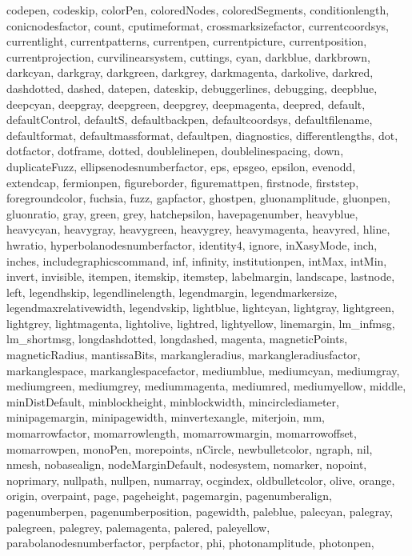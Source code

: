 {{  codepen, codeskip, colorPen, coloredNodes, coloredSegments,
  conditionlength, conicnodesfactor, count, cputimeformat,
  crossmarksizefactor, currentcoordsys, currentlight, currentpatterns,
  currentpen, currentpicture, currentposition, currentprojection,
  curvilinearsystem, cuttings, cyan, darkblue, darkbrown, darkcyan, darkgray,
  darkgreen, darkgrey, darkmagenta, darkolive, darkred, dashdotted, dashed,
  datepen, dateskip, debuggerlines, debugging, deepblue, deepcyan, deepgray,
  deepgreen, deepgrey, deepmagenta, deepred, default, defaultControl,
  defaultS, defaultbackpen, defaultcoordsys, defaultfilename, defaultformat,
  defaultmassformat, defaultpen, diagnostics, differentlengths, dot,
  dotfactor, dotframe, dotted, doublelinepen, doublelinespacing, down,
  duplicateFuzz, ellipsenodesnumberfactor, eps, epsgeo, epsilon, evenodd,
  extendcap, fermionpen, figureborder, figuremattpen, firstnode, firststep,
  foregroundcolor, fuchsia, fuzz, gapfactor, ghostpen, gluonamplitude,
  gluonpen, gluonratio, gray, green, grey, hatchepsilon, havepagenumber,
  heavyblue, heavycyan, heavygray, heavygreen, heavygrey, heavymagenta,
  heavyred, hline, hwratio, hyperbolanodesnumberfactor, identity4, ignore,
  inXasyMode, inch, inches, includegraphicscommand, inf, infinity,
  institutionpen, intMax, intMin, invert, invisible, itempen, itemskip,
  itemstep, labelmargin, landscape, lastnode, left, legendhskip,
  legendlinelength, legendmargin, legendmarkersize, legendmaxrelativewidth,
  legendvskip, lightblue, lightcyan, lightgray, lightgreen, lightgrey,
  lightmagenta, lightolive, lightred, lightyellow, linemargin, lm_infmsg,
  lm_shortmsg, longdashdotted, longdashed, magenta, magneticPoints,
  magneticRadius, mantissaBits, markangleradius, markangleradiusfactor,
  markanglespace, markanglespacefactor, mediumblue, mediumcyan, mediumgray,
  mediumgreen, mediumgrey, mediummagenta, mediumred, mediumyellow, middle,
  minDistDefault, minblockheight, minblockwidth, mincirclediameter,
  minipagemargin, minipagewidth, minvertexangle, miterjoin, mm,
  momarrowfactor, momarrowlength, momarrowmargin, momarrowoffset,
  momarrowpen, monoPen, morepoints, nCircle, newbulletcolor, ngraph, nil,
  nmesh, nobasealign, nodeMarginDefault, nodesystem, nomarker, nopoint,
  noprimary, nullpath, nullpen, numarray, ocgindex, oldbulletcolor, olive,
  orange, origin, overpaint, page, pageheight, pagemargin, pagenumberalign,
  pagenumberpen, pagenumberposition, pagewidth, paleblue, palecyan, palegray,
  palegreen, palegrey, palemagenta, palered, paleyellow,
  parabolanodesnumberfactor, perpfactor, phi, photonamplitude, photonpen,
}}
